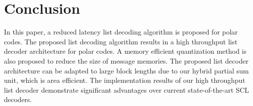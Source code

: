 \documentclass[journal]{IEEEtran}
\begin{document}
\section{Conclusion} \label{sec: conclusion}
In this paper, a reduced latency list decoding algorithm is proposed for polar codes. The proposed list decoding algorithm results in a high throughput list decoder architecture for polar codes. A memory efficient quantization method is also proposed to reduce the size of message memories. The proposed list decoder architecture can be adapted to large block lengths due to our hybrid partial sum unit, which is area efficient. The implementation results of our high throughput list decoder demonstrate significant advantages over current state-of-the-art SCL decoders.



\end{document}

